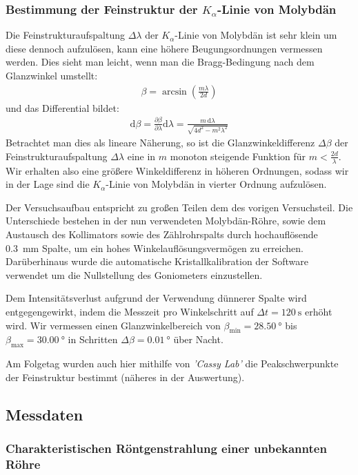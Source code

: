\documentclass[10pt, a4paper]{article}
\begin{document}
\subsubsection{Bestimmung der Feinstruktur der $K_\alpha$-Linie von Molybdän}
Die Feinstrukturaufspaltung $\Delta \lambda$ der $K_\alpha$-Linie von Molybdän ist sehr klein um diese dennoch aufzulösen, kann eine höhere Beugungsordnungen vermessen werden.
Dies sieht man leicht, wenn man die Bragg-Bedingung nach dem Glanzwinkel umstellt:
\begin{align}
  \beta = \arcsin \left( \frac{m \lambda}{2 d} \right)
\end{align}
und das Differential bildet:
\begin{align}
  \mathrm{d}\beta = \frac{\partial \beta}{\partial \lambda} \mathrm{d}\lambda = \frac{m\, \mathrm{d}\lambda}{\sqrt{4 d^2 - m^2 \lambda^2}}
\end{align}
Betrachtet man dies als lineare Näherung, so ist die Glanzwinkeldifferenz $\Delta \beta$ der Feinstrukturaufspaltung $\Delta \lambda$ eine in $m$ monoton steigende Funktion für $m < \frac{2d}{\lambda}$.
Wir erhalten also eine größere Winkeldifferenz in höheren Ordnungen, sodass wir in der Lage sind die $K_\alpha$-Linie von Molybdän in vierter Ordnung aufzulösen.

Der Versuchsaufbau entspricht zu großen Teilen dem des vorigen Versuchsteil.
Die Unterschiede bestehen in der nun verwendeten Molybdän-Röhre, sowie dem Austausch des Kollimators sowie des Zählrohrspalts durch hochauflösende \SI{0,3}{\milli\metre} Spalte, um ein hohes Winkelauflösungsvermögen zu erreichen.
Darüberhinaus wurde die automatische Kristallkalibration der Software verwendet um die Nullstellung des Goniometers einzustellen.

Dem Intensitätsverlust aufgrund der Verwendung dünnerer Spalte wird entgegengewirkt, indem die Messzeit pro Winkelschritt auf $\Delta t = \SI{120}{\second}$ erhöht wird.
Wir vermessen einen Glanzwinkelbereich von $\beta_\mathrm{min} = \SI{28,50}{\degree}$ bis $\beta_\mathrm{max} = \SI{30,00}{\degree}$ in Schritten $\Delta \beta = \SI{0,01}{\degree}$ über Nacht.

Am Folgetag wurden auch hier mithilfe von \emph{'Cassy Lab'} die Peakschwerpunkte der Feinstruktur bestimmt (näheres in der Auswertung).

\subsection{Messdaten}
\subsubsection{Charakteristischen Röntgenstrahlung einer unbekannten Röhre}
\end{document}
